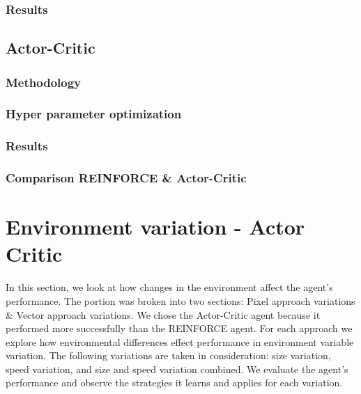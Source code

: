 \documentclass{article}
\begin{document}
    \subsubsection{Results}
    \label{R-Results}
    
    
    \subsection{Actor-Critic}
    \label{A-Actor-Critic}
    
    \subsubsection{Methodology}
    \label{AC-Method}
    
    \subsubsection{Hyper parameter optimization}
    \label{AC-HPO}
    
    \subsubsection{Results}
    \label{AC-Results}
    
    \subsubsection{Comparison REINFORCE \& Actor-Critic}
    \label{R/AC-Comparison}
    
    
    \section{Environment variation - Actor Critic}
    \label{Environment}
    In this section, we look at how changes in the environment affect the agent's performance. 
    The portion was broken into two sections: Pixel approach variations \& Vector approach variations.
    We chose the Actor-Critic agent because it performed more successfully than the REINFORCE agent.
    For each approach we explore how environmental differences effect performance in environment variable variation. 
    The following variations are taken in consideration: size variation, speed variation, and size and speed variation combined.
    We evaluate the agent's performance and observe the strategies it learns and applies for each variation.
    
\end{document}
